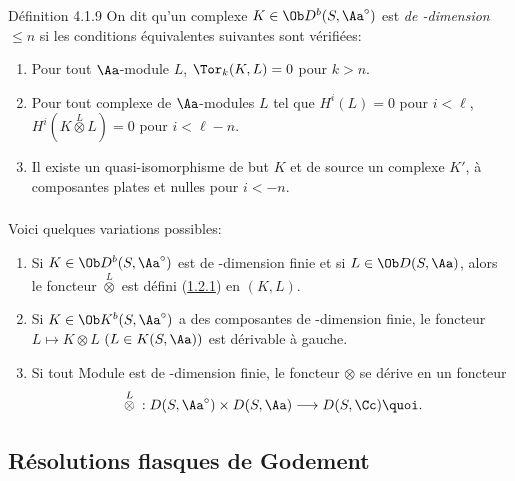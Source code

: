 \documentclass[10pt]{../fichiers-configuration-latex/smfart}
\begin{document}
\begin{enonce*}{Définition 4.1.9}
On dit qu'un complexe $K\in \Ob D^{b}(S,\Aa^{\circ})$ est \emph{de
\tTor-dimension $\leq n$} si les conditions équivalentes suivantes
sont vérifiées:
\begin{enumerate}
\renewcommand{\theenumi}{\roman{enumi}}
\renewcommand{\labelenumi}{(\theenumi)}
\item Pour tout $\Aa$-module $L$, $\Tor_{k}(K,L)=0$ pour
$k>n$.

\item Pour tout complexe de $\Aa$-modules $L$ tel que
$H^{i}(L)=0$ pour $i<\ell$, $H^{i}(K\overset{L}{\otimes}L)=0$
pour $i<\ell-n$.

\item Il existe un quasi-isomorphisme de but $K$ et de source un
complexe $K'$, à composantes plates et nulles pour $i<-n$.
\end{enumerate}
\end{enonce*}

\setcounter{subsubsection}{9}
\subsubsection{}
Voici quelques variations possibles:
\begin{enumerate}
\renewcommand{\theenumi}{\roman{enumi}}
\renewcommand{\labelenumi}{(\theenumi)}
\item Si $K\in \Ob D^{b}(S,\Aa^{\circ})$ est de \ttor-dimension
finie et si $L\in \Ob D(S,\Aa)$, alors le foncteur
$\overset{L}{\otimes}$ est défini (\hyperref[XVII.def1.2.1]{1.2.1}) en $(K,L)$.

\item Si $K\in \Ob K^{b}(S,\Aa^{\circ})$ a des composantes de
\tTor-dimension finie, le foncteur $L\mapsto K\otimes L$ $(L\in
K(S,\Aa))$ est dérivable à gauche.

\item Si tout Module est de \tTor-dimension finie, le foncteur $\otimes$
se dérive en un foncteur
\[
{}\overset{L}{\otimes}{}:D(S,\Aa^{\circ})\times
D(S,\Aa)\longrightarrow D(S,\Cc){\quoi}.
\]
\end{enumerate}

\subsection{Résolutions flasques de Godement}\pageoriginale
\end{document}
